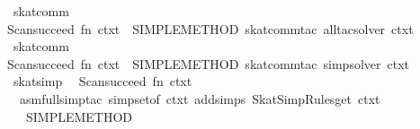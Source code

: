 \begin{isabellebody}
{}\isanewline
\isanewline
{}\isamarkupfalse%
\ skat{}comm{}\ {}\ {}\isanewline
Scan{}succeed\ {}fn\ ctxt\ {}{}\ SIMPLE{}METHOD{}\ {}skat{}comm{}tac\ all{}tac{}solver\ ctxt{}{}\isanewline
{}\isanewline
\isanewline
{}\isamarkupfalse%
\ skat{}comm\ {}\ {}\isanewline
Scan{}succeed\ {}fn\ ctxt\ {}{}\ SIMPLE{}METHOD{}\ {}skat{}comm{}tac\ simp{}solver\ ctxt{}{}\isanewline
{}\isanewline
\isanewline
{}\isamarkupfalse%
\ skat{}simp\ {}\ {}\isanewline
Scan{}succeed\ {}fn\ ctxt\ {}{}\isanewline
\ \ asm{}full{}simp{}tac\ {}simpset{}of\ ctxt\ addsimps\ SkatSimpRules{}get\ ctxt{}\ {}\isanewline
\ \ {}{}\ SIMPLE{}METHOD{}\isanewline
{}\isanewline

\end{isabellebody}
